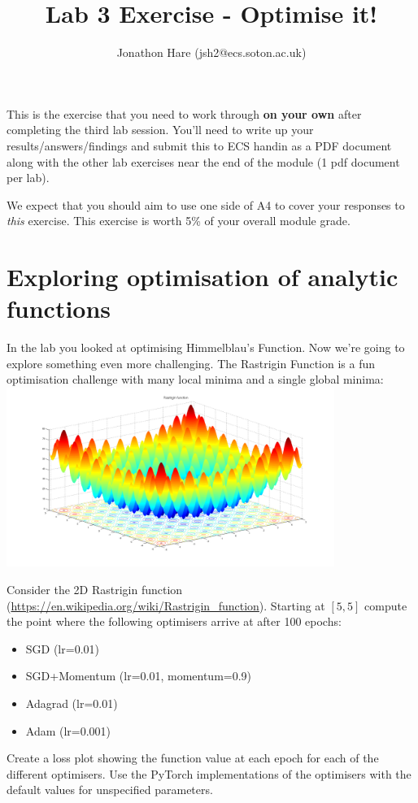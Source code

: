 \documentclass[a4paper]{article}
\begin{document}
\lstset{language=Python,upquote=true}

\setlength{\leftskip}{20pt}
\title{Lab 3 Exercise - Optimise it!}
\author{Jonathon Hare (jsh2@ecs.soton.ac.uk)}

\maketitle


This is the exercise that you need to work through \textbf{on your own} after completing the third lab session. You'll need to write up your results/answers/findings and submit this to ECS handin as a PDF document along with the other lab exercises near the end of the module (1 pdf document per lab). 

We expect that you should aim to use one side of A4 to cover your responses to \emph{this} exercise. This exercise is worth 5\% of your overall module grade.

\section{Exploring optimisation of analytic functions}\label{analytic}
In the lab you looked at optimising Himmelblau's Function. Now we're going to explore something even more challenging. The Rastrigin Function is a fun optimisation challenge with many local minima and a single global minima:
\center
\includegraphics[width=0.8\textwidth]{Rastrigin_function.png}

\begin{tcolorbox}[title=1.1 Rastrigin (3 marks)]
Consider the 2D Rastrigin function (\url{https://en.wikipedia.org/wiki/Rastrigin\_function}). Starting at $[5, 5]$ compute the point where the following optimisers arrive at after 100 epochs:

\begin{itemize}
	\item SGD (lr=0.01)
	\item SGD+Momentum (lr=0.01, momentum=0.9)
	\item Adagrad (lr=0.01)
	\item Adam (lr=0.001)
\end{itemize}

Create a loss plot showing the function value at each epoch for each of the different optimisers. Use the PyTorch implementations of the optimisers with the default values for unspecified parameters.
\end{tcolorbox}
\end{document}
